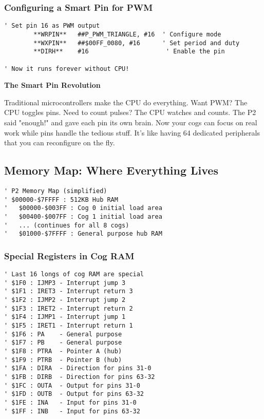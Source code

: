 \documentclass[11pt]{book}
\begin{document}
\hypertarget{configuring-a-smart-pin-for-pwm}{%
\subsubsection{Configuring a Smart Pin for
PWM}\label{configuring-a-smart-pin-for-pwm}}

\begin{lstlisting}
' Set pin 16 as PWM output
        **WRPIN**   ##P_PWM_TRIANGLE, #16  ' Configure mode
        **WXPIN**   ##$00FF_0080, #16      ' Set period and duty
        **DIRH**    #16                     ' Enable the pin
        
' Now it runs forever without CPU!
\end{lstlisting}

\begin{interlude}
\textbf{The Smart Pin Revolution}

Traditional microcontrollers make the CPU do everything. Want PWM? The CPU toggles pins. Need to count pulses? The CPU watches and counts. The P2 said "enough!" and gave each pin its own brain. Now your cogs can focus on real work while pins handle the tedious stuff. It's like having 64 dedicated peripherals that you can reconfigure on the fly.
\end{interlude}

\hypertarget{memory-map-where-everything-lives}{%
\subsection{Memory Map: Where Everything
Lives}\label{memory-map-where-everything-lives}}

\begin{lstlisting}
' P2 Memory Map (simplified)
' $00000-$7FFFF : 512KB Hub RAM
'   $00000-$003FF : Cog 0 initial load area
'   $00400-$007FF : Cog 1 initial load area
'   ... (continues for all 8 cogs)
'   $01000-$7FFFF : General purpose hub RAM
\end{lstlisting}

\hypertarget{special-registers-in-cog-ram}{%
\subsubsection{Special Registers in Cog
RAM}\label{special-registers-in-cog-ram}}

\begin{lstlisting}
' Last 16 longs of cog RAM are special
' $1F0 : IJMP3 - Interrupt jump 3
' $1F1 : IRET3 - Interrupt return 3
' $1F2 : IJMP2 - Interrupt jump 2
' $1F3 : IRET2 - Interrupt return 2
' $1F4 : IJMP1 - Interrupt jump 1
' $1F5 : IRET1 - Interrupt return 1
' $1F6 : PA    - General purpose
' $1F7 : PB    - General purpose
' $1F8 : PTRA  - Pointer A (hub)
' $1F9 : PTRB  - Pointer B (hub)
' $1FA : DIRA  - Direction for pins 31-0
' $1FB : DIRB  - Direction for pins 63-32
' $1FC : OUTA  - Output for pins 31-0
' $1FD : OUTB  - Output for pins 63-32
' $1FE : INA   - Input for pins 31-0
' $1FF : INB   - Input for pins 63-32
\end{lstlisting}
\end{document}
